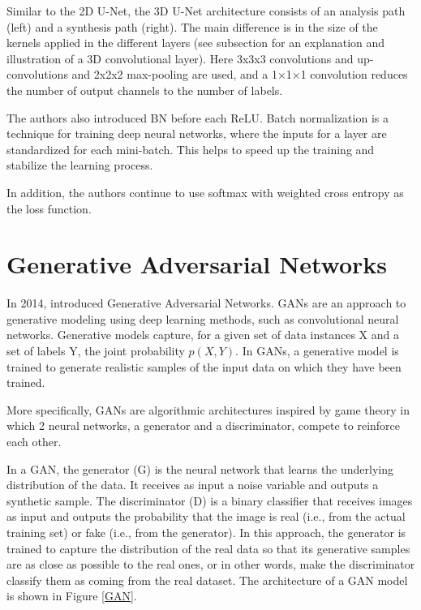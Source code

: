 Similar to the \ac{2D} U-Net, the \ac{3D} U-Net architecture consists of an analysis path (left) and a synthesis path (right). The main difference is in the size of the kernels applied in the different layers (see subsection  for an explanation and illustration of a \ac{3D} convolutional layer). Here 3x3x3 convolutions and up-convolutions and 2x2x2 max-pooling are used, and a 1×1×1 convolution reduces the number of output channels to the number of labels. 

The authors also introduced \ac{BN} before each \ac{ReLU}. Batch normalization is a technique for training deep neural networks, where the inputs for a layer are standardized for each mini-batch. This helps to speed up the training and stabilize the learning process.

In addition, the authors continue to use softmax with weighted cross entropy as the loss function.


\section{Generative Adversarial Networks}
\label{section:GANs}
In 2014, \citet{GAN_original} introduced Generative Adversarial Networks. \ac{GANs} are an approach to generative modeling using deep learning methods, such as convolutional neural networks. Generative models capture, for a given set of data instances X and a set of labels Y, the joint probability $p(X, Y)$. In \ac{GANs}, a generative model is trained to generate realistic samples of the input data on which they have been trained.

More specifically, \ac{GANs} are algorithmic architectures inspired by game theory in which 2 neural networks, a generator and a discriminator, compete to reinforce each other. 

In a \ac{GAN}, the generator (G) is the neural network that learns the underlying distribution of the data. It receives as input a noise variable and outputs a synthetic sample. The discriminator (D) is a binary classifier that receives images as input and outputs the probability that the image is real (i.e., from the actual training set) or fake (i.e., from the generator). In this approach, the generator is trained to capture the distribution of the real data so that its generative samples are as close as possible to the real ones, or in other words, make the discriminator classify them as coming from the real dataset. The architecture of a \ac{GAN} model is shown in Figure \ref{GAN}. 

